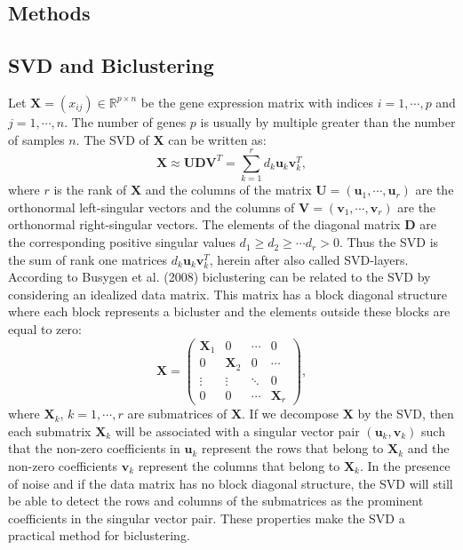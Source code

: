 \documentclass{bioinfo}
\begin{document}
\begin{methods}
\section{Methods}
\subsection{SVD and Biclustering}
Let $\mathbf{X}=(x_{ij}) \in \mathbb{R}^{p \times n}$  be the gene expression matrix with indices $i=1,\cdots,p$ and $j=1,\cdots,n$. The number of genes $p$ is usually by multiple greater than the number of samples $n$. The SVD of $\mathbf{X}$ can be written as:
\begin{equation}
 \mathbf{X} \approx \mathbf{U}\mathbf{D}\mathbf{V}^{T} = \sum_{k=1}^{r}d_{k}\mathbf{u}_{k}\mathbf{v}_{k}^{T},
\end{equation}
where $r$ is the rank of $\mathbf{X}$ and the columns of the matrix $\mathbf{U}=(\mathbf{u}_{1},\cdots,\mathbf{u}_{r})$ are the orthonormal left-singular vectors  and the columns of $\mathbf{V}=(\mathbf{v}_{1},\cdots,\mathbf{v}_{r})$ are the orthonormal right-singular vectors. The elements of the diagonal matrix $\mathbf{D}$ are the corresponding positive singular values $d_{1} \geq d_{2} \geq \cdots d_{r} > 0$. 
Thus the SVD is the sum of rank one matrices $d_{k}\mathbf{u}_{k}\mathbf{v}_{k}^{T}$, herein after also called SVD-layers.
According to Busygen et al. (2008) biclustering can be related to the SVD by considering an idealized data matrix.
This matrix has a block diagonal structure where each block represents a bicluster and the elements outside these blocks are equal to zero:
\begin{equation}
\mathbf{X}=
\begin{pmatrix} 
\mathbf{X}_{1} & 0 & \cdots & 0\\
0 & \mathbf{X}_{2} & 0 & \cdots \\
\vdots  & \vdots  & \ddots  & 0 \\
0 & 0 & \cdots & \mathbf{X}_{r}
\end{pmatrix},
\end{equation}
where $\mathbf{X}_{k}$, $k=1,\cdots,r$ are submatrices of $\mathbf{X}$. If we decompose $\mathbf{X}$ by the SVD, then each submatrix $\mathbf{X}_{k}$ will be associated with a singular vector pair $(\mathbf{u}_{k},\mathbf{v}_{k})$ such that the non-zero coefficients in $\mathbf{u}_{k}$ represent the rows that belong to $\mathbf{X}_{k}$ and the non-zero coefficients $\mathbf{v}_{k}$ represent the columns that belong to $\mathbf{X}_{k}$. In the presence of noise and if the data matrix has no block diagonal structure, the SVD will still be able to detect the rows and columns of the submatrices as the prominent coefficients in the singular vector pair. These properties make the SVD a practical method for biclustering. 


\end{methods}
\end{document}
